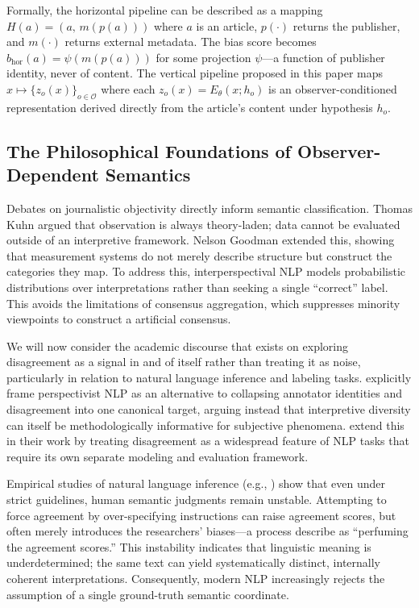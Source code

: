 Formally, the horizontal pipeline can be described as a mapping $H(a) = (a,\, m(p(a)))$ where $a$ is an article, $p(\cdot)$ returns the publisher, and $m(\cdot)$ returns external metadata. The bias score becomes $b_{\text{hor}}(a) = \psi(m(p(a)))$ for some projection $\psi$---a function of publisher identity, never of content. The vertical pipeline proposed in this paper maps $x \mapsto \{z_o(x)\}_{o \in \mathcal{O}}$ where each $z_o(x) = E_\theta(x; h_o)$ is an observer-conditioned representation derived directly from the article's content under hypothesis $h_o$.

\subsection{The Philosophical Foundations of Observer-Dependent Semantics}

Debates on journalistic objectivity directly inform semantic classification. Thomas Kuhn \citeyearpar{kuhn1962} argued that observation is always theory-laden; data cannot be evaluated outside of an interpretive framework. Nelson Goodman \citeyearpar{goodman1978} extended this, showing that measurement systems do not merely describe structure but construct the categories they map. To address this, interperspectival NLP models probabilistic distributions over interpretations rather than seeking a single ``correct'' label. This avoids the limitations of consensus aggregation, which suppresses minority viewpoints to construct a artificial consensus.

We will now consider the academic discourse that exists on exploring disagreement as a signal in and of itself rather than treating it as noise, particularly in relation to natural language inference and labeling tasks. \citet{frenda2024} explicitly frame perspectivist NLP as an alternative to collapsing annotator identities and disagreement into one canonical target, arguing instead that interpretive diversity can itself be methodologically informative for subjective phenomena. \citet{xujurgens2026} extend this in their work by treating disagreement as a widespread feature of NLP tasks that require its own separate modeling and evaluation framework.

Empirical studies of natural language inference (e.g., \citealp{pavlick2019}) show that even under strict guidelines, human semantic judgments remain unstable. Attempting to force agreement by over-specifying instructions can raise agreement scores, but often merely introduces the researchers' biases---a process \citet{aroyo2015} describe as ``perfuming the agreement scores.'' This instability indicates that linguistic meaning is underdetermined; the same text can yield systematically distinct, internally coherent interpretations. Consequently, modern NLP increasingly rejects the assumption of a single ground-truth semantic coordinate.

